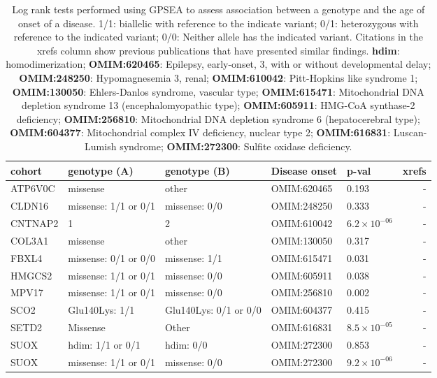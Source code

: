 \documentclass[12pt]{article}
\begin{document}
\begin{table}
\centering
\begin{tabular}{lp{3.5cm}p{3.5cm}>{\raggedright}p{2.5cm}lr}
\toprule
\textbf{cohort} & \textbf{genotype (A)} & \textbf{genotype (B)} & \textbf{Disease onset} & \textbf{p-val} & \textbf{xrefs}\\
\midrule
ATP6V0C & missense & other & OMIM:620465  & 0.193 & -\\
CLDN16 & missense: 1/1 or 0/1  & missense: 0/0 & OMIM:248250  & 0.333 & -\\
CNTNAP2 & 1 & 2 & OMIM:610042  & $6.2 \times 10^{-06}$ & -\\
COL3A1 & missense & other &  OMIM:130050  & 0.317 & -\\
FBXL4 &missense: 0/1 or 0/0 &missense: 1/1 & OMIM:615471  & 0.031 & -\\
HMGCS2 & missense: 1/1 or 0/1&  missense: 0/0 &  OMIM:605911  & 0.038 & -\\
MPV17 & missense: 1/1 or 0/1 &  missense: 0/0 &  OMIM:256810  & 0.002 & -\\
SCO2 & Glu140Lys: 1/1  & Glu140Lys: 0/1 or 0/0 &  OMIM:604377  & 0.415 & -\\
SETD2 & Missense & Other &  OMIM:616831  & $8.5 \times 10^{-05}$ & -\\
SUOX & hdim: 1/1 or 0/1 & hdim: 0/0&  OMIM:272300  & 0.853 & -\\
SUOX & missense: 1/1 or 0/1 &  missense: 0/0 &  OMIM:272300  & $9.2 \times 10^{-06}$ & -\\
\bottomrule
\end{tabular}
\caption{Log rank tests performed using GPSEA to assess association between a genotype and the age of
    onset of a disease. 1/1: biallelic with reference to the indicate variant; 
    0/1: heterozygous with reference to the indicated variant; 0/0: Neither allele has the indicated variant.
    Citations in the xrefs column show previous publications that have presented similar findings. \textbf{hdim}: homodimerization;
   \textbf{ OMIM:620465}: Epilepsy, early-onset, 3, with or without developmental delay; 
   \textbf{OMIM:248250}: Hypomagnesemia 3, renal;
   \textbf{OMIM:610042}: Pitt-Hopkins like syndrome 1;
   \textbf{OMIM:130050}: Ehlers-Danlos syndrome, vascular type;
   \textbf{OMIM:615471}: Mitochondrial DNA depletion syndrome 13 (encephalomyopathic type);
   \textbf{OMIM:605911}:  HMG-CoA synthase-2 deficiency;
   \textbf{OMIM:256810}: Mitochondrial DNA depletion syndrome 6 (hepatocerebral type);
   \textbf{OMIM:604377}: Mitochondrial complex IV deficiency, nuclear type 2;
   \textbf{OMIM:616831}: Luscan-Lumish syndrome;
  \textbf{OMIM:272300}: Sulfite oxidase deficiency.
   }
\label{tab:disease_onset}
\end{table}
\end{document}
